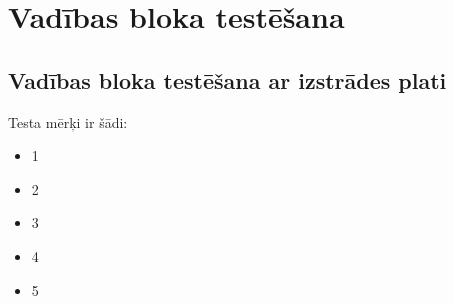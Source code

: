 \chapter{Vadības bloka testēšana}

\section{Vadības bloka testēšana ar izstrādes plati}


Testa mērķi ir šādi:
\begin{itemize}
    \item 1
    \item 2
    \item 3
    \item 4
    \item 5
\end{itemize}